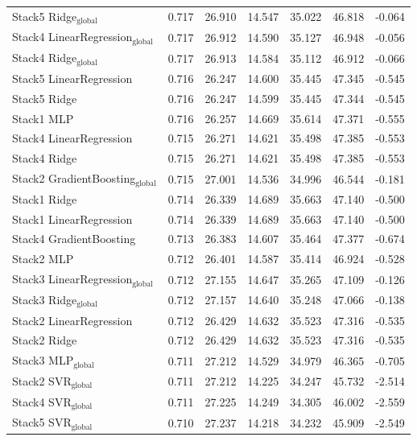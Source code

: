 \begin{table}
{\begin{tabular}{p{4.5cm}cccccc}
        Stack5 Ridge$_{\text{global}}$ & 0.717 & 26.910 & 14.547 & 35.022 & 46.818 & -0.064 \\
        Stack4 LinearRegression$_{\text{global}}$ & 0.717 & 26.912 & 14.590 & 35.127 & 46.948 & -0.056 \\
        Stack4 Ridge$_{\text{global}}$ & 0.717 & 26.913 & 14.584 & 35.112 & 46.912 & -0.066 \\
        Stack5 LinearRegression & 0.716 & 26.247 & 14.600 & 35.445 & 47.345 & -0.545 \\
        Stack5 Ridge & 0.716 & 26.247 & 14.599 & 35.445 & 47.344 & -0.545 \\
        Stack1 MLP & 0.716 & 26.257 & 14.669 & 35.614 & 47.371 & -0.555 \\
        Stack4 LinearRegression & 0.715 & 26.271 & 14.621 & 35.498 & 47.385 & -0.553 \\
        Stack4 Ridge & 0.715 & 26.271 & 14.621 & 35.498 & 47.385 & -0.553 \\
        Stack2 GradientBoosting$_{\text{global}}$ & 0.715 & 27.001 & 14.536 & 34.996 & 46.544 & -0.181 \\
        Stack1 Ridge & 0.714 & 26.339 & 14.689 & 35.663 & 47.140 & -0.500 \\
        Stack1 LinearRegression & 0.714 & 26.339 & 14.689 & 35.663 & 47.140 & -0.500 \\
        Stack4 GradientBoosting & 0.713 & 26.383 & 14.607 & 35.464 & 47.377 & -0.674 \\
        Stack2 MLP & 0.712 & 26.401 & 14.587 & 35.414 & 46.924 & -0.528 \\
        Stack3 LinearRegression$_{\text{global}}$ & 0.712 & 27.155 & 14.647 & 35.265 & 47.109 & -0.126 \\
        Stack3 Ridge$_{\text{global}}$ & 0.712 & 27.157 & 14.640 & 35.248 & 47.066 & -0.138 \\
        Stack2 LinearRegression & 0.712 & 26.429 & 14.632 & 35.523 & 47.316 & -0.535 \\
        Stack2 Ridge & 0.712 & 26.429 & 14.632 & 35.523 & 47.316 & -0.535 \\
        Stack3 MLP$_{\text{global}}$ & 0.711 & 27.212 & 14.529 & 34.979 & 46.365 & -0.705 \\
        Stack2 SVR$_{\text{global}}$ & 0.711 & 27.212 & 14.225 & 34.247 & 45.732 & -2.514 \\
        Stack4 SVR$_{\text{global}}$ & 0.711 & 27.225 & 14.249 & 34.305 & 46.002 & -2.559 \\
        Stack5 SVR$_{\text{global}}$ & 0.710 & 27.237 & 14.218 & 34.232 & 45.909 & -2.549 \\

\end{tabular}}
\end{table}
